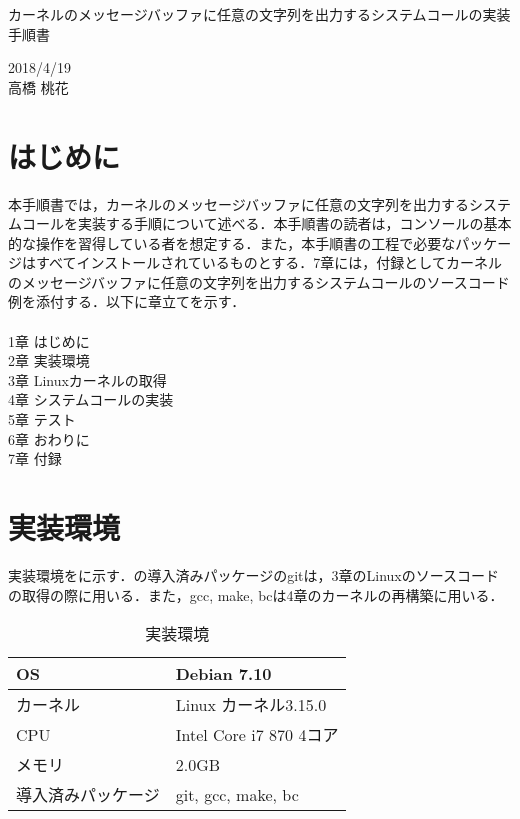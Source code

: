 \documentclass[12pt]{jsarticle}
\begin{document}
\begin{center}
{\LARGE カーネルのメッセージバッファに任意の文字列を出力するシステムコールの実装手順書}
\end{center}

\begin{flushright}
  2018/4/19\\
  高橋 桃花
\end{flushright}
\section{はじめに}
\label{sec:introduction}
本手順書では，カーネルのメッセージバッファに任意の文字列を出力するシステムコールを実装する手順について述べる．本手順書の読者は，コンソールの基本的な操作を習得している者を想定する．また，本手順書の工程で必要なパッケージはすべてインストールされているものとする．7章には，付録としてカーネルのメッセージバッファに任意の文字列を出力するシステムコールのソースコード例を添付する．以下に章立てを示す． \\ \\
1章 はじめに \\
2章 実装環境 \\
3章 Linuxカーネルの取得 \\
4章 システムコールの実装 \\
5章 テスト \\
6章 おわりに \\
7章 付録 

\section{実装環境}
\label{sec:devenv}
実装環境をに示す．の導入済みパッケージのgitは，3章のLinuxのソースコードの取得の際に用いる．また，gcc, make, bcは4章のカーネルの再構築に用いる．

\begin{table}[h]
  \begin{center}
    \caption{実装環境}\label{tab:devenv_table}
    \begin{tabular}{l|l}
      \hline \hline
      OS & Debian 7.10 \\ \hline
      カーネル & Linux カーネル3.15.0 \\ \hline
      CPU & Intel Core i7 870 4コア\\ \hline
      メモリ & 2.0GB \\ \hline
      導入済みパッケージ & git, gcc, make, bc \\ \hline
    \end{tabular}
  \end{center}
\end{table}
\end{document}
